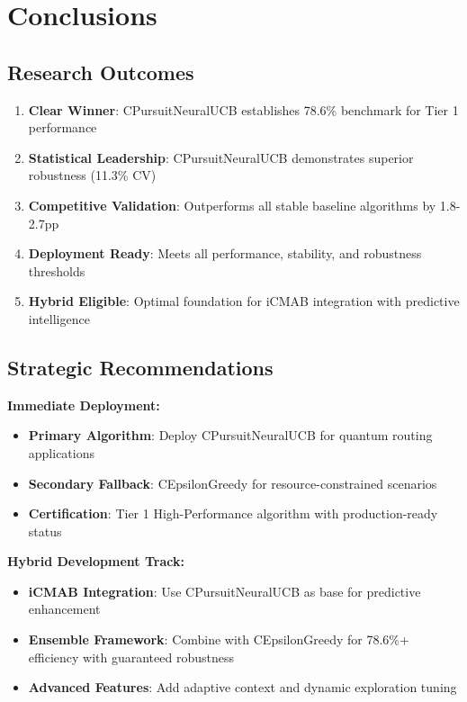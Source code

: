 \documentclass[12pt,a4paper]{article}
\newcommand{\primarytext}[1]{\textcolor{primaryblue}{\textbf{#1}}}
\newcommand{\secondarytext}[1]{\textcolor{secondaryblue}{\textbf{#1}}}
\newcommand{\success}[1]{\textcolor{accentgreen}{\textbf{#1}}}
\begin{document}
\section{Conclusions}

\subsection{Research Outcomes}

\begin{enumerate}
\item \primarytext{Clear Winner}: CPursuitNeuralUCB establishes 78.6\% benchmark for Tier 1 performance
\item \success{Statistical Leadership}: CPursuitNeuralUCB demonstrates superior robustness (11.3\% CV)
\item \secondarytext{Competitive Validation}: Outperforms all stable baseline algorithms by 1.8-2.7pp
\item \textbf{Deployment Ready}: Meets all performance, stability, and robustness thresholds
\item \success{Hybrid Eligible}: Optimal foundation for iCMAB integration with predictive intelligence
\end{enumerate}

\subsection{Strategic Recommendations}

\textbf{Immediate Deployment:}
\begin{itemize}
\item \primarytext{Primary Algorithm}: Deploy CPursuitNeuralUCB for quantum routing applications
\item \secondarytext{Secondary Fallback}: CEpsilonGreedy for resource-constrained scenarios
\item \success{Certification}: Tier 1 High-Performance algorithm with production-ready status
\end{itemize}

\textbf{Hybrid Development Track:}
\begin{itemize}
\item \textbf{iCMAB Integration}: Use CPursuitNeuralUCB as base for predictive enhancement
\item \textbf{Ensemble Framework}: Combine with CEpsilonGreedy for 78.6\%+ efficiency with guaranteed robustness
\item \textbf{Advanced Features}: Add adaptive context and dynamic exploration tuning
\end{itemize}
\end{document}
